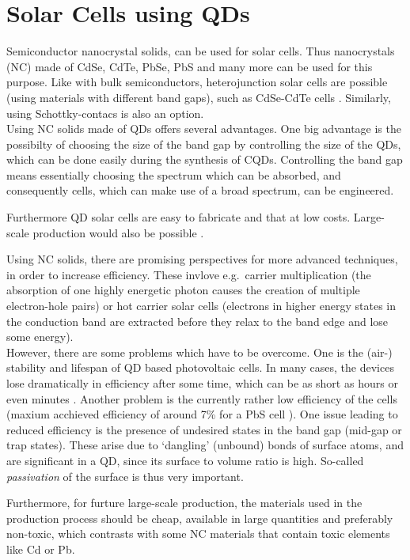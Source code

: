 \section{Solar Cells using QDs}

Semiconductor nanocrystal solids, can be used for solar cells. Thus nanocrystals (NC) made of CdSe, CdTe, PbSe, PbS and many more can be used for this purpose. Like with bulk semiconductors, heterojunction solar cells are possible (using materials with different band gaps), such as CdSe-CdTe cells \cite[p.430]{ChemRev}. Similarly, using Schottky-contacs is also an option.\\

Using NC solids made of QDs offers several advantages. One big advantage is the possibilty of choosing the size of the band gap by controlling the size of the QDs, which can be done easily during the synthesis of CQDs. Controlling the band gap means essentially choosing the spectrum which can be absorbed, and consequently cells, which can make use of a broad spectrum, can be engineered.

Furthermore QD solar cells are easy to fabricate and that at low costs. Large-scale production would also be possible \cite[p.447]{ChemRev}.

Using NC solids, there are promising perspectives for more advanced techniques, in order to increase efficiency. These invlove e.g.~carrier multiplication (the absorption of one highly energetic photon causes the creation of multiple electron-hole pairs) or hot carrier solar cells (electrons in higher energy states in the conduction band are extracted before they relax to the band edge and lose some energy).\\

However, there are some problems which have to be overcome. One is the (air-) stability and lifespan of QD based photovoltaic cells. In many cases, the devices lose dramatically in efficiency after some time, which can be as short as hours or even minutes \cite[p.26]{Tang2011}. Another problem is the currently rather low efficiency of the cells (maxium acchieved efficiency of around 7\% for a PbS cell \cite[p.1]{Ip2012}). One issue leading to reduced efficiency is the presence of undesired states in the band gap (mid-gap or trap states). These arise due to `dangling' (unbound) bonds of surface atoms, and are significant in a QD, since its surface to volume ratio is high. So-called \textit{passivation} of the surface is thus very important. 

Furthermore, for furture large-scale production, the materials used in the production process should be cheap,  available in large quantities and preferably non-toxic, which contrasts with some NC materials that contain toxic elements like Cd or Pb.

